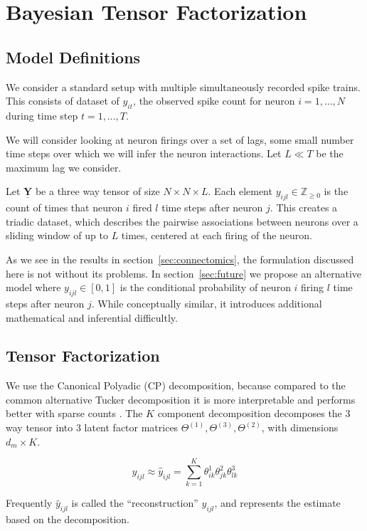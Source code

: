 \documentclass{article}
\newcommand{\tensor}[1]{\ensuremath{\underline{\mathbf{#1}}}}
\begin{document}
\section{Bayesian Tensor Factorization}
\label{sec:btf}
\subsection{Model Definitions}
\label{sec:model}
We consider a standard setup with multiple simultaneously recorded spike trains. This consists of dataset of $y_{it}$, the observed spike count for neuron $i=1,\ldots,N$ during time step $t=1,\ldots,T$. 

We will consider looking at neuron firings over a set of lags, some small number time steps over which we will infer the neuron interactions. Let $L \ll T$ be the maximum lag we consider. 

Let $\tensor{Y}$ be a three way tensor of size $N \times N \times L$. Each element $y_{ijl} \in \mathbb{Z}_{\geq 0}$ is the count of times that neuron $i$ fired $l$ time steps after neuron $j$. This creates a triadic dataset, which describes the pairwise associations between neurons over a sliding window of up to $L$ times, centered at each firing of the neuron.

As we see in the results in section~\ref{sec:connectomics}, the formulation discussed here is not without its problems. In section~\ref{sec:future} we propose an alternative model where $y_{ijl} \in [0, 1]$ is the conditional probability of neuron $i$ firing $l$ time steps after neuron $j$. While conceptually similar, it introduces additional mathematical and inferential difficultly. 

\subsection{Tensor Factorization}
\label{sec:factorization}
We use the Canonical Polyadic (CP) decomposition, because compared to the common alternative Tucker decomposition it is more interpretable and performs better with sparse counts \cite{schein2015bayesian,kolda2008scalable}. The $K$ component decomposition decomposes the 3 way tensor into 3 latent factor matrices $\Theta^{(1)}, \Theta^{(3)}, \Theta^{(2)}$, with dimensions $d_m \times K$. 

$$y_{ijl} \approx \hat{y}_{ijl} = \sum_{k=1}^K \theta^{1}_{ik} \theta^{2}_{jk} \theta^{3}_{lk}$$

Frequently $\hat{y}_{ijl}$ is called the ``reconstruction'' $y_{ijl}$, and represents the estimate based on the decomposition.
\end{document}
